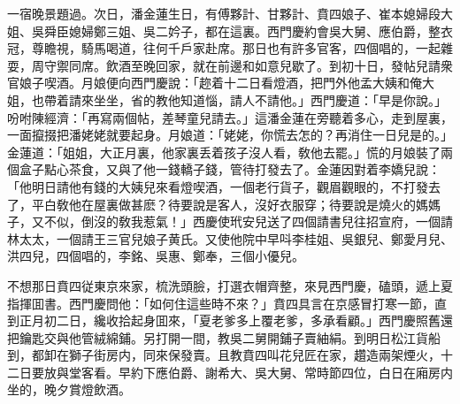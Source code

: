 一宿晚景題過。次日，潘金蓮生日，有傅夥計、甘夥計、賁四娘子、崔本媳婦段大姐、吳舜臣媳婦鄭三姐、吳二妗子，都在這裏。西門慶約會吳大舅、應伯爵，整衣冠，尊瞻視，騎馬喝道，往何千戶家赴席。那日也有許多官客，四個唱的，一起雜耍，周守禦同席。飲酒至晚回家，就在前邊和如意兒歇了。到初十日，發帖兒請衆官娘子喫酒。月娘便向西門慶說：「趂着十二日看燈酒，把門外他孟大姨和俺大姐，也帶着請來坐坐，省的教他知道惱，請人不請他。」西門慶道：「早是你說。」吩咐陳經濟：「再寫兩個帖，差琴童兒請去。」這潘金蓮在旁聽着多心，走到屋裏，一面攛掇把潘姥姥就要起身。月娘道：「姥姥，你慌去怎的？再消住一日兒是的。」金蓮道：「姐姐，大正月裏，他家裏丢着孩子沒人看，敎他去罷。」慌的月娘裝了兩個盒子點心茶食，又與了他一錢轎子錢，管待打發去了。金蓮因對着李嬌兒說：「他明日請他有錢的大姨兒來看燈喫酒，一個老行貨子，觀眉觀眼的，不打發去了，平白敎他在屋裏做甚麽？待要說是客人，沒好衣服穿；待要說是燒火的媽媽子，又不似，倒沒的敎我惹氣！」西慶使玳安兒送了四個請書兒往招宣府，一個請林太太，一個請王三官兒娘子黄氏。又使他院中早呌李桂姐、吳銀兒、鄭愛月兒、洪四兒，四個唱的，李銘、吳惠、鄭奉，三個小優兒。

不想那日賁四従東京來家，梳洗頭臉，打選衣帽齊整，來見西門慶，磕頭，遞上夏指揮囬書。西門慶問他：「如何住這些時不來？」賁四具言在京感冒打寒一節，直到正月初二日，纔收拾起身囬來，「夏老爹多上覆老爹，多承看顧。」西門慶照舊還把鑰匙交與他管絨綿鋪。另打開一間，教吳二舅開鋪子賣紬絹。到明日松江貨船到，都卸在獅子街房内，同來保發賣。且教賁四叫花兒匠在家，趲造兩架煙火，十二日要放與堂客看。早約下應伯爵、謝希大、吳大舅、常時節四位，白日在廂房内坐的，晚夕賞燈飲酒。

